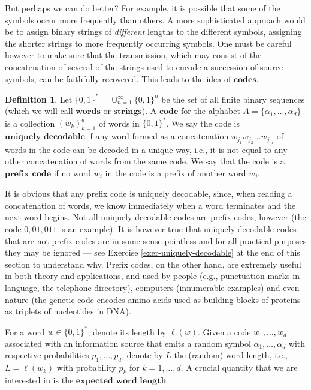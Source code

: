 \documentclass[11pt]{report}
\theoremstyle{plain}
\theoremstyle{definition}
\newtheorem{defn}[thm]{Definition}
\begin{document}
But perhaps we can do better? For example, it is possible that some of the symbols occur more frequently than others. A more sophisticated approach would be to assign binary strings of \emph{different} lengths to the different symbols, assigning the shorter strings to more frequently occurring symbols. One must be careful however to make sure that the transmission, which may consist of the concatenation of several of the strings used to encode a succession of source symbols, can be faithfully recovered. This leads to the idea of $\textbf{codes}$.

\begin{defn}
Let $\{0,1\}^*=\cup_{n=1}^\infty \{0,1\}^n$ be the set of all finite binary sequences (which we will call $\textbf{words}$ or $\textbf{strings}$). A $\textbf{code}$ for the alphabet $A=\{ \alpha_1,\ldots,\alpha_d\}$ is a collection $(w_k)_{k=1}^d$ of words in $\{0,1\}^*$. We say the code is $\textbf{uniquely decodable}$ if any word formed as a concatenation $w_{j_1}w_{j_2}\ldots w_{j_m}$ of words in the code can be decoded in a unique way, i.e., it is not equal to any other concatenation of words from the same code. We say that the code is a $\textbf{prefix code}$ if no word $w_i$ in the code is a prefix of another word $w_j$.
\end{defn}

It is obvious that any prefix code is uniquely decodable, since, when reading a concatenation of words, we know immediately when a word terminates and the next word begins. Not all uniquely decodable codes are prefix codes, however (the code $0, 01, 011$ is an example). It is however true that uniquely decodable codes that are not prefix codes are in some sense pointless and for all practical purposes they may be ignored --- see Exercise \ref{exer-uniquely-decodable} at the end of this section to understand why. Prefix codes, on the other hand, are extremely useful in both theory and applications, and used by people (e.g., punctuation marks in language, the telephone directory), computers (innumerable examples) and even nature (the genetic code encodes amino acids used as building blocks of proteins as triplets of nucleotides in DNA).

For a word $w\in \{0,1\}^*$, denote its length by $\ell(w)$. Given a code $w_1,\ldots,w_d$ associated with an information source that emits a random symbol $\alpha_1,\ldots,\alpha_d$ with respective probabilities $p_1,\ldots,p_d$, denote by $L$ the (random) word length, i.e., $L=\ell(w_k)$ with probability $p_k$ for $k=1,\ldots,d$. A crucial quantity that we are interested in is the $\textbf{expected word length}$
\end{document}
